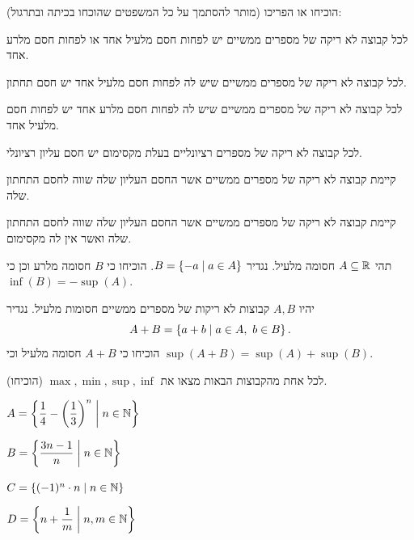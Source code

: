 \documentclass{infi-ex}
\begin{document}
\makeextitle

\begin{question}
הוכיחו או הפריכו (מותר להסתמך על כל המשפטים שהוכחו בכיתה ובתרגול):
\begin{parts}
  \item לכל קבוצה לא ריקה של מספרים ממשיים יש לפחות חסם מלעיל אחד או לפחות חסם מלרע אחד.
  \item לכל קבוצה לא ריקה של מספרים ממשיים שיש לה לפחות חסם מלעיל אחד יש חסם תחתון.
  \item לכל קבוצה לא ריקה של מספרים ממשיים שיש לה לפחות חסם מלרע אחד יש לפחות חסם מלעיל אחד.
  \item לכל קבוצה לא ריקה של מספרים רציונליים בעלת מקסימום יש חסם עליון רציונלי.
  \item קיימת קבוצה לא ריקה של מספרים ממשיים אשר החסם העליון שלה שווה לחסם התחתון שלה.
  \item קיימת קבוצה לא ריקה של מספרים ממשיים אשר החסם העליון שלה שווה לחסם התחתון שלה ואשר אין לה מקסימום.
\end{parts}
\end{question}

\begin{question}
תהי $A\subseteq\mathbb{R}$ חסומה מלעיל. נגדיר $B=\left\{ -a \;\middle|\; a\in A \right\}$.
הוכיחו כי $B$ חסומה מלרע וכן כי $\inf(B)=-\sup(A)$.
\end{question}

\begin{question}
יהיו $A,B$ קבוצות לא ריקות של מספרים ממשיים חסומות מלעיל. נגדיר
\[ A+B=\left\{ a+b \;\middle|\; a\in A,\ b\in B \right\}. \]
הוכיחו כי $A+B$ חסומה מלעיל וכי $\sup(A+B)=\sup(A)+\sup(B)$.
\end{question}

\begin{question}
לכל אחת מהקבוצות הבאות מצאו את $\max,\min,\sup,\inf$ (הוכיחו).
\begin{parts}
  \item $A=\left\{ \dfrac14-\left(\dfrac13\right)^n \;\middle|\; n\in\mathbb{N} \right\}$
  \item $B=\left\{ \dfrac{3n-1}{n} \;\middle|\; n\in\mathbb{N} \right\}$
  \item $C=\left\{ (-1)^n\cdot n \;\middle|\; n\in\mathbb{N} \right\}$
  \item $D=\left\{ n+\dfrac1m \;\middle|\; n,m\in\mathbb{N} \right\}$
\end{parts}
\end{question}
\end{document}
